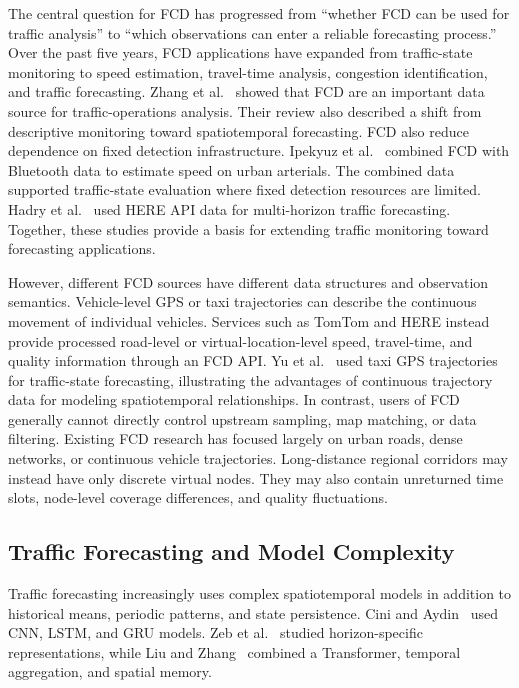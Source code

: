 \documentclass[pdflatex,sn-mathphys-num,iicol]{sn-jnl}
\begin{document}
The central question for FCD has progressed from ``whether FCD can be used for traffic analysis'' to ``which observations can enter a reliable forecasting process.'' Over the past five years, FCD applications have expanded from traffic-state monitoring to speed estimation, travel-time analysis, congestion identification, and traffic forecasting. Zhang et al.~\cite{Zhang2025FCD} showed that FCD are an important data source for traffic-operations analysis. Their review also described a shift from descriptive monitoring toward spatiotemporal forecasting. FCD also reduce dependence on fixed detection infrastructure. Ipekyuz et al.~\cite{Ipekyuz2025FCD} combined FCD with Bluetooth data to estimate speed on urban arterials. The combined data supported traffic-state evaluation where fixed detection resources are limited. Hadry et al.~\cite{Hadry2025TrafficForecasting} used HERE API data for multi-horizon traffic forecasting. Together, these studies provide a basis for extending traffic monitoring toward forecasting applications.

However, different FCD sources have different data structures and observation semantics. Vehicle-level GPS or taxi trajectories can describe the continuous movement of individual vehicles. Services such as TomTom and HERE instead provide processed road-level or virtual-location-level speed, travel-time, and quality information through an FCD API. Yu et al.~\cite{Yu2024AutoformerFCD} used taxi GPS trajectories for traffic-state forecasting, illustrating the advantages of continuous trajectory data for modeling spatiotemporal relationships. In contrast, users of FCD generally cannot directly control upstream sampling, map matching, or data filtering. Existing FCD research has focused largely on urban roads, dense networks, or continuous vehicle trajectories. Long-distance regional corridors may instead have only discrete virtual nodes. They may also contain unreturned time slots, node-level coverage differences, and quality fluctuations.



\subsection{Traffic Forecasting and Model Complexity}
\label{subsec:model-complexity}

Traffic forecasting increasingly uses complex spatiotemporal models in addition to historical means, periodic patterns, and state persistence. Cini and Aydin~\cite{Cini2024DeepEnsemble} used CNN, LSTM, and GRU models. Zeb et al.~\cite{Zeb2024FeatureProjection} studied horizon-specific representations, while Liu and Zhang~\cite{Liu2024SpatialTemporalTransformer} combined a Transformer, temporal aggregation, and spatial memory.
\end{document}
